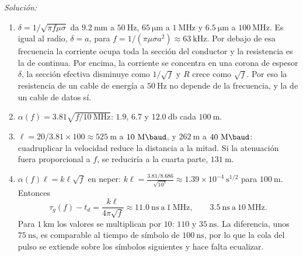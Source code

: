 \documentclass[a4paper,11pt]{article}
\newenvironment{solucion}[1][]{
\noindent \large \textsl{Solución:} \ifthenelse{\equal{#1}{}}{}{\emph{(#1)}}

\smallskip
}{
\bigskip
}
\begin{document}
\begin{solucion}
\begin{enumerate}
\item $\delta=1/\sqrt{\pi f\mu\sigma}$ da $9.2\ \unit{\milli\meter}$ a $50\ \unit{\hertz}$, $65\ \unit{\micro\meter}$ a $1\ \unit{\mega\hertz}$ y $6.5\ \unit{\micro\meter}$ a $100\ \unit{\mega\hertz}$. Es igual al radio, $\delta=a$, para $f=1/(\pi\mu\sigma a^2)\approx63\ \unit{\kilo\hertz}$. Por debajo de esa frecuencia la corriente ocupa toda la sección del conductor y la resistencia es la de continua. Por encima, la corriente se concentra en una corona de espesor $\delta$, la sección efectiva disminuye como $1/\sqrt f$ y $R$ crece como $\sqrt f$. Por eso la resistencia de un cable de energía a $50\ \unit{\hertz}$ no depende de la frecuencia, y la de un cable de datos sí.
\item $\alpha(f)=3.81\sqrt{f/10\ \unit{\mega\hertz}}$: $1.9$, $6.7$ y $12.0\ \unit{\decibel}$ cada $100\ \unit{\meter}$.
\item $\ell=20/3.81\times100\approx525\ \unit{\meter}$ a $10\ \unit{\mega\baud}$, y $262\ \unit{\meter}$ a $40\ \unit{\mega\baud}$: cuadruplicar la velocidad reduce la distancia a la mitad. Si la atenuación fuera proporcional a $f$, se reduciría a la cuarta parte, $131\ \unit{\meter}$.
\item $\alpha(f)\ell=k\ell\sqrt f$ en neper: $k\ell=\frac{3.81/8.686}{\sqrt{10^7}}\approx1.39\times10^{-4}\ \unit{\second^{1/2}}$ para $100\ \unit{\meter}$. Entonces
\begin{equation*}
\tau_g(f)-t_d=\frac{k\ell}{4\pi\sqrt f}\approx11.0\ \unit{\nano\second}\ \text{a}\ 1\ \unit{\mega\hertz},\qquad 3.5\ \unit{\nano\second}\ \text{a}\ 10\ \unit{\mega\hertz}.
\end{equation*}
Para $1\ \unit{\kilo\meter}$ los valores se multiplican por $10$: $110$ y $35\ \unit{\nano\second}$. La diferencia, unos $75\ \unit{\nano\second}$, es comparable al tiempo de símbolo de $100\ \unit{\nano\second}$, por lo que la cola del pulso se extiende sobre los símbolos siguientes y hace falta ecualizar.
\end{enumerate}
\end{solucion}
\end{document}
